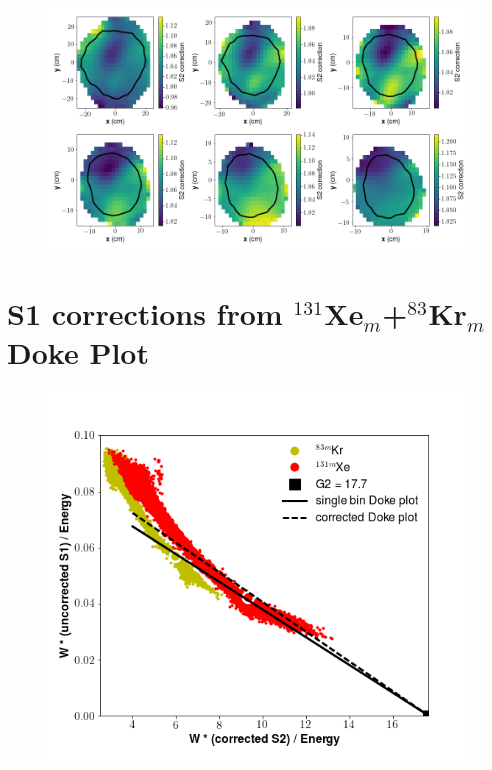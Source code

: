 \begin{figure}[h!]
\centering
\includegraphics[width=150mm]{Figures/S2corr_xy.png}
\caption{}
\label{fig:S2corr_xy} 
\end{figure}



\section{S1 corrections from $^{131}$Xe$_{m}$+$^{83}$Kr$_{m}$ Doke Plot}
\begin{figure}[h!]
\centering
\includegraphics[width=150mm]{Figures/S1corr_singlebin.png}
\caption{}
\label{fig:S1corr_singlebin} 
\end{figure}


